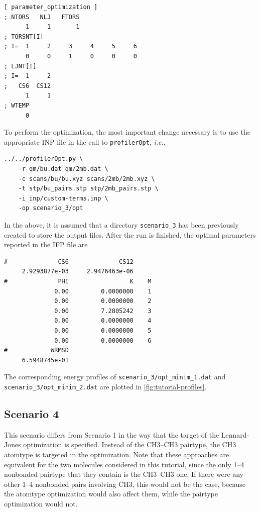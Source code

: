 \documentclass[10pt,a4paper]{report}
\numberwithin{equation}{section}
\newcommand{\under}{\_}
\newcommand{\profileropt}[0]{\texttt{profilerOpt}}
\begin{document}
\begin{lstlisting}[language=gromacs]
[ parameter_optimization ]
; NTORS   NLJ   FTORS
      1     1       1    
; TORSNT[I]
; I=  1     2     3     4     5     6
      0     0     1     0     0     0
; LJNT[I]
; I=  1     2
;   CS6  CS12
      1     1
; WTEMP
      0
\end{lstlisting}\vspace{-2ex}\par

\noindent 
%
To perform the optimization, the most important change necessary is to
use the appropriate INP file in the call to \profileropt,
\textit{i.e.},

\begin{lstlisting}
../../profilerOpt.py \
    -r qm/bu.dat qm/2mb.dat \
    -c scans/bu/bu.xyz scans/2mb/2mb.xyz \
    -t stp/bu_pairs.stp stp/2mb_pairs.stp \
    -i inp/custom-terms.inp \
    -op scenario_3/opt 
\end{lstlisting}\vspace{-2ex}\par

\noindent In the above, it is assumed that a directory
\texttt{scenario\under{}3} has been previously created to store the
output files.
%
After the run is finished, the optimal parameters reported in the IFP
file are

\begin{lstlisting}
#              CS6              CS12
     2.9293877e-03     2.9476463e-06
#              PHI                 K    M
              0.00         0.0000000    1
              0.00         0.0000000    2
              0.00         7.2805242    3
              0.00         0.0000000    4
              0.00         0.0000000    5
              0.00         0.0000000    6
#            WRMSD
     6.5948745e-01
\end{lstlisting}\vspace{-2ex}\par

\noindent The corresponding energy profiles of
\texttt{scenario\under{}3/opt\under{}minim\under{}1.dat} and
\texttt{scenario\under{}3/opt\under{}minim\under{}2.dat} are plotted
in \autoref{fig:tutorial-profiles}.

\subsection{Scenario 4}
\label{sec:tutorial-scenario-4}

This scenario differs from Scenario 1 in the way that the target of
the Lennard-Jones optimization is specified.
%
Instead of the CH3--CH3 pairtype, the CH3 atomtype is targeted in the
optimization.
%
Note that these approaches are equivalent for the two molecules
considered in this tutorial, since the only 1--4 nonbonded pairtype
that they contain is the CH3--CH3 one.
%
If there were any other 1--4 nonbonded pairs involving CH3, this would
not be the case, because the atomtype optimization would also affect
them, while the pairtype optimization would not.
%
\end{document}
